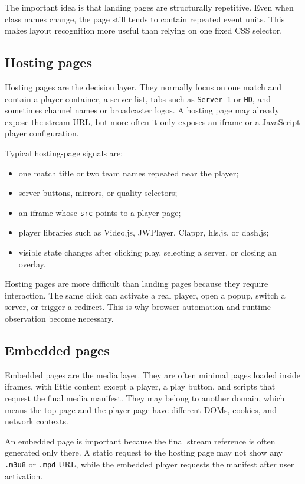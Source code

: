 The important idea is that landing pages are structurally repetitive. Even when class
names change, the page still tends to contain repeated event units. This makes layout
recognition more useful than relying on one fixed CSS selector.

\subsection{Hosting pages}

Hosting pages are the decision layer. They normally focus on one match and contain a
player container, a server list, tabs such as \texttt{Server 1} or \texttt{HD}, and
sometimes channel names or broadcaster logos. A hosting page may already expose the
stream URL, but more often it only exposes an iframe or a JavaScript player
configuration.

Typical hosting-page signals are:

\begin{itemize}
  \item one match title or two team names repeated near the player;
  \item server buttons, mirrors, or quality selectors;
  \item an iframe whose \texttt{src} points to a player page;
  \item player libraries such as Video.js, JWPlayer, Clappr, hls.js, or dash.js;
  \item visible state changes after clicking play, selecting a server, or closing an
    overlay.
\end{itemize}

Hosting pages are more difficult than landing pages because they require interaction.
The same click can activate a real player, open a popup, switch a server, or trigger a
redirect. This is why browser automation and runtime observation become necessary.

\subsection{Embedded pages}

Embedded pages are the media layer. They are often minimal pages loaded inside iframes,
with little content except a player, a play button, and scripts that request the final
media manifest. They may belong to another domain, which means the top page and the
player page have different DOMs, cookies, and network contexts.

An embedded page is important because the final stream reference is often generated only
there. A static request to the hosting page may not show any \texttt{.m3u8} or
\texttt{.mpd} URL, while the embedded player requests the manifest after user
activation.

